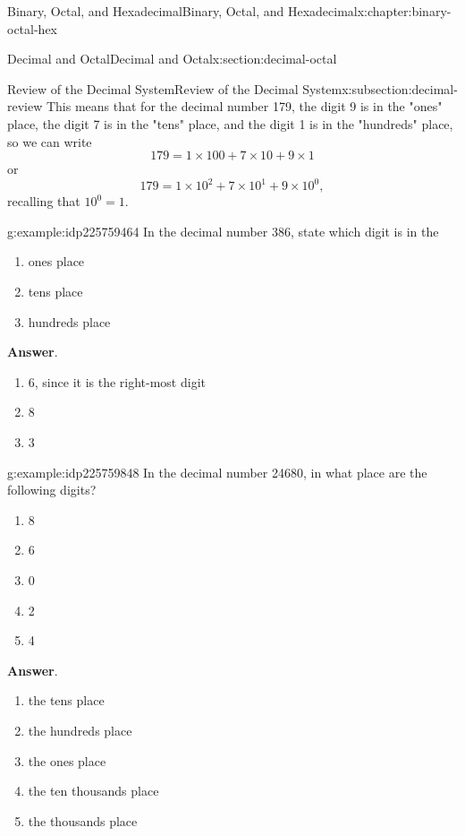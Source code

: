 \documentclass[twoside,10pt,]{book}
\newcommand{\blocktitlefont}{\relax}
\numberwithin{equation}{section}
\begin{document}
\begin{chapterptx}{Binary, Octal, and Hexadecimal}{}{Binary, Octal, and Hexadecimal}{}{}{x:chapter:binary-octal-hex}
\begin{sectionptx}{Decimal and Octal}{}{Decimal and Octal}{}{}{x:section:decimal-octal}
\begin{subsectionptx}{Review of the Decimal System}{}{Review of the Decimal System}{}{}{x:subsection:decimal-review}
This means that for the decimal number 179, the digit 9 is in the "ones" place, the digit 7 is in the "tens" place, and the digit 1 is in the "hundreds" place, so we can write%
\begin{equation*}
179=1\times 100+7\times 10+9\times 1
\end{equation*}
or%
\begin{equation*}
179=1\times 10^2+7\times 10^1+9\times 10^0,
\end{equation*}
recalling that \(10^0=1\).%
\begin{example}{}{g:example:idp225759464}%
In the decimal number 386, state which digit is in the%
\begin{enumerate}
\item{}ones place%
\item{}tens place%
\item{}hundreds place%
\end{enumerate}
%
\par\smallskip%
\noindent\textbf{\blocktitlefont Answer}.\label{g:answer:idp225760360}{}\hypertarget{g:answer:idp225760360}{}\quad{}%
\begin{enumerate}
\item{}6, since it is the right-most digit%
\item{}8%
\item{}3%
\end{enumerate}
%
\end{example}
\begin{example}{}{g:example:idp225759848}%
In the decimal number 24680, in what place are the following digits?%
\begin{enumerate}
\item{}8%
\item{}6%
\item{}0%
\item{}2%
\item{}4%
\end{enumerate}
%
\par\smallskip%
\noindent\textbf{\blocktitlefont Answer}.\label{g:answer:idp225755496}{}\hypertarget{g:answer:idp225755496}{}\quad{}%
\begin{enumerate}
\item{}the tens place%
\item{}the hundreds place%
\item{}the ones place%
\item{}the ten thousands place%
\item{}the thousands place%
\end{enumerate}

\end{example}
\end{subsectionptx}
\end{sectionptx}
\end{chapterptx}
\end{document}
